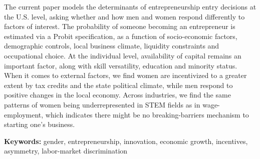 \singlespacing 
The current paper models the determinants of entrepreneurship entry decisions at the U.S. level, asking whether and how men and women respond differently to factors of interest. The probability of someone becoming an entrepreneur is estimated via a Probit specification, as a function of socio-economic factors, demographic controls, local business climate, liquidity constraints and occupational choice. At the individual level, availability of capital remains an important factor, along with skill versatility, education and minority status. When it comes to external factors, we find women are incentivized to a greater extent by tax credits and the state political climate, while men respond to positive changes in the local economy. Across industries, we find the same patterns of women being underrepresented in STEM fields as in wage-employment, which indicates there might be no breaking-barriers mechanism to starting one's business. 

\singlespacing \textbf{Keywords:} gender, entrepreneurship, innovation, economic growth, incentives, asymmetry, labor-market discrimination 

\bodyspacing